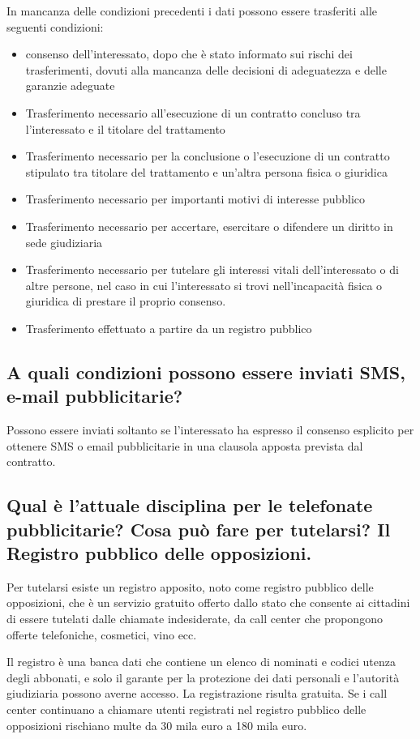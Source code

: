 In mancanza delle condizioni precedenti i dati possono essere trasferiti alle seguenti condizioni:
\begin{itemize}
    \item consenso dell'interessato, dopo che è stato informato sui rischi dei trasferimenti, dovuti alla mancanza delle decisioni di adeguatezza e delle garanzie adeguate
    \item Trasferimento necessario all'esecuzione di un contratto concluso tra l'interessato e il titolare del trattamento
    \item Trasferimento necessario per la conclusione o l'esecuzione di un contratto stipulato tra titolare del trattamento e un'altra persona fisica o giuridica
    \item Trasferimento necessario per importanti motivi di interesse pubblico
    \item Trasferimento necessario per accertare, esercitare o difendere un diritto in sede giudiziaria
    \item Trasferimento necessario per tutelare gli interessi vitali dell'interessato o di altre persone, nel caso in cui l'interessato si trovi nell'incapacità fisica o giuridica di prestare il proprio consenso.
    \item Trasferimento effettuato a partire da un registro pubblico
\end{itemize}
\subsection{A quali condizioni possono essere inviati SMS, e-mail pubblicitarie?}
Possono essere inviati soltanto se l'interessato ha espresso il consenso esplicito per ottenere SMS o email pubblicitarie in una clausola apposta prevista dal contratto.

\subsection{Qual è l'attuale disciplina per le telefonate pubblicitarie? Cosa può fare per tutelarsi? Il Registro
pubblico delle opposizioni.}

Per tutelarsi esiste un registro apposito, noto come registro pubblico delle opposizioni, che è un servizio gratuito offerto dallo stato che consente ai cittadini di essere tutelati dalle chiamate indesiderate, da call center che propongono offerte telefoniche, cosmetici, vino ecc.

Il registro è una banca dati che contiene un elenco di nominati e codici utenza degli abbonati, e solo il garante per la protezione dei dati personali e l'autorità giudiziaria possono averne accesso.
La registrazione risulta gratuita. Se i call center continuano a chiamare utenti registrati nel registro pubblico delle opposizioni rischiano multe da 30 mila euro a 180 mila euro.

